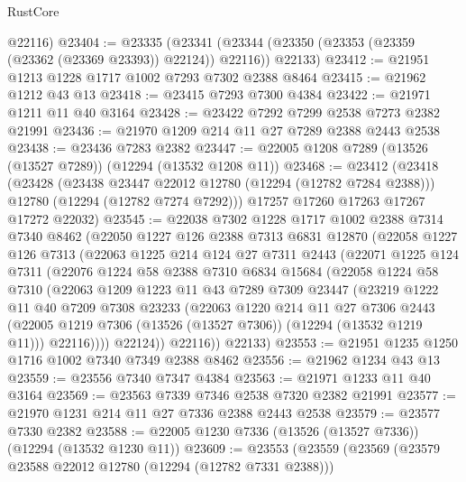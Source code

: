 \begin{lexlean}{RustCore}
\begin{coremodule}
      @22116)
@23404 := @23335
    (@23341 (@23344 (@23350 (@23353 (@23359 (@23362 (@23369 @23393)) @22124)) @22116)) @22133)
@23412 := @21951 @1213 @1228 @1717 @1002 @7293 @7302 @2388 @8464
@23415 := @21962 @1212 @43 @13
@23418 := @23415 @7293 @7300 @4384
@23422 := @21971 @1211 @11 @40 @3164
@23428 := @23422 @7292 @7299 @2538 @7273 @2382 @21991
@23436 := @21970 @1209 @214 @11 @27 @7289 @2388 @2443 @2538
@23438 := @23436 @7283 @2382
@23447 := @22005 @1208 @7289 (@13526 (@13527 @7289)) (@12294 (@13532 @1208 @11))
@23468 := @23412
    (@23418
      (@23428
        (@23438 @23447 @22012 @12780 (@12294 (@12782 @7284 @2388)))
        @12780
        (@12294 (@12782 @7274 @7292)))
      @17257
      @17260
      @17263
      @17267
      @17272
      @22032)
@23545 := @22038
    @7302
    @1228
    @1717
    @1002
    @2388
    @7314
    @7340
    @8462
    (@22050
      @1227
      @126
      @2388
      @7313
      @6831
      @12870
      (@22058
        @1227
        @126
        @7313
        (@22063
          @1225
          @214
          @124
          @27
          @7311
          @2443
          (@22071
            @1225
            @124
            @7311
            (@22076
              @1224
              @58
              @2388
              @7310
              @6834
              @15684
              (@22058
                @1224
                @58
                @7310
                (@22063
                  @1209
                  @1223
                  @11
                  @43
                  @7289
                  @7309
                  @23447
                  (@23219
                    @1222
                    @11
                    @40
                    @7209
                    @7308
                    @23233
                    (@22063
                      @1220
                      @214
                      @11
                      @27
                      @7306
                      @2443
                      (@22005 @1219 @7306 (@13526 (@13527 @7306)) (@12294 (@13532 @1219 @11)))
                      @22116))))
              @22124))
          @22116))
      @22133)
@23553 := @21951 @1235 @1250 @1716 @1002 @7340 @7349 @2388 @8462
@23556 := @21962 @1234 @43 @13
@23559 := @23556 @7340 @7347 @4384
@23563 := @21971 @1233 @11 @40 @3164
@23569 := @23563 @7339 @7346 @2538 @7320 @2382 @21991
@23577 := @21970 @1231 @214 @11 @27 @7336 @2388 @2443 @2538
@23579 := @23577 @7330 @2382
@23588 := @22005 @1230 @7336 (@13526 (@13527 @7336)) (@12294 (@13532 @1230 @11))
@23609 := @23553
    (@23559
      (@23569
        (@23579 @23588 @22012 @12780 (@12294 (@12782 @7331 @2388)))

\end{coremodule}
\end{lexlean}
